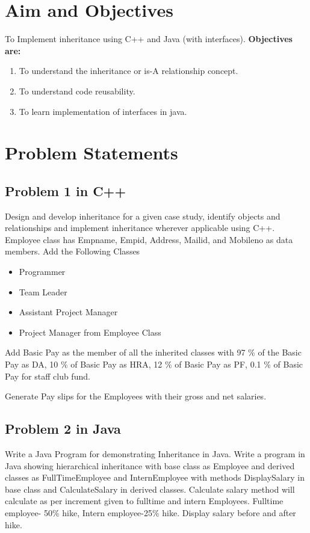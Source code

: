 \documentclass[11pt]{article}
\begin{document}
\tableofcontents
\thispagestyle{empty}
\clearpage


\setcounter{page}{1}

\section{Aim and Objectives}
To Implement inheritance using C++ and Java (with interfaces).
\textbf{Objectives are: }
\begin{enumerate}
	\item To understand the inheritance or is-A relationship concept.
	\item To understand code reusability.
	\item To learn implementation of interfaces in java.
\end{enumerate}
\section{Problem Statements}
\subsection{Problem 1 in C++}

Design and develop inheritance for a given case study, identify objects and relationships
and implement inheritance wherever applicable using C++.\\
Employee class has Empname, Empid, Address, Mailid, and Mobileno as data
members.
Add the Following Classes
\begin{itemize}
	\item Programmer
	\item Team Leader
	\item Assistant Project Manager
	\item Project Manager from Employee Class
\end{itemize}
\noindent
Add Basic Pay as the member of all the inherited classes with 97 \% of the Basic Pay as DA, 10 \% of Basic Pay as HRA, 12 \% of  Basic Pay as PF, 0.1 \% of Basic Pay for staff club fund.

Generate Pay slips for the Employees with their gross and net salaries.

\subsection{Problem 2 in Java}
Write a Java Program for demonstrating Inheritance in Java.
Write a program in Java showing hierarchical inheritance with base class as Employee and
derived classes as FullTimeEmployee and InternEmployee with methods DisplaySalary in
base class and CalculateSalary in derived classes.
Calculate salary method will calculate as per increment given to fulltime and intern
Employees. Fulltime employee- 50\% hike, Intern employee-25\% hike. Display salary
before and after hike.
\end{document}
